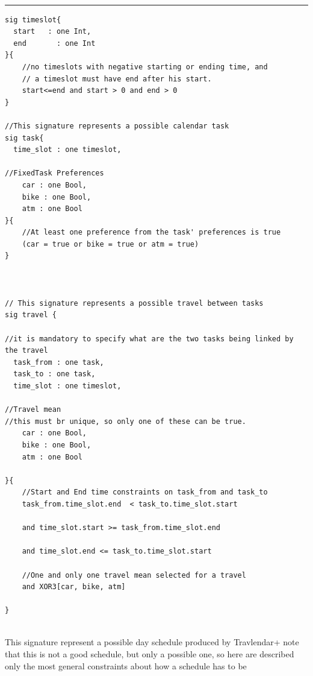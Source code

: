 \\
\rule{\textwidth}{0.4pt}

\begin{verbatim}
sig timeslot{
  start   : one Int,
  end		: one Int 
}{
    //no timeslots with negative starting or ending time, and
    // a timeslot must have end after his start.
	start<=end and start > 0 and end > 0
}

//This signature represents a possible calendar task
sig task{
  time_slot : one timeslot,

//FixedTask Preferences
    car : one Bool,
    bike : one Bool,
    atm : one Bool
}{
    //At least one preference from the task' preferences is true
    (car = true or bike = true or atm = true)
}



// This signature represents a possible travel between tasks
sig travel {

//it is mandatory to specify what are the two tasks being linked by the travel
  task_from : one task,
  task_to : one task,
  time_slot : one timeslot,

//Travel mean 
//this must br unique, so only one of these can be true.
    car : one Bool,
    bike : one Bool,
    atm : one Bool

}{
    //Start and End time constraints on task_from and task_to
    task_from.time_slot.end  < task_to.time_slot.start   

    and time_slot.start >= task_from.time_slot.end         

    and time_slot.end <= task_to.time_slot.start

    //One and only one travel mean selected for a travel
    and XOR3[car, bike, atm]

}
\end{verbatim}
\hrulefill 
\\
This signature represent a possible day schedule produced by Travlendar+
note that this is not a good schedule, but only a possible one, so here
are described only the most general constraints about how a schedule has to
be
